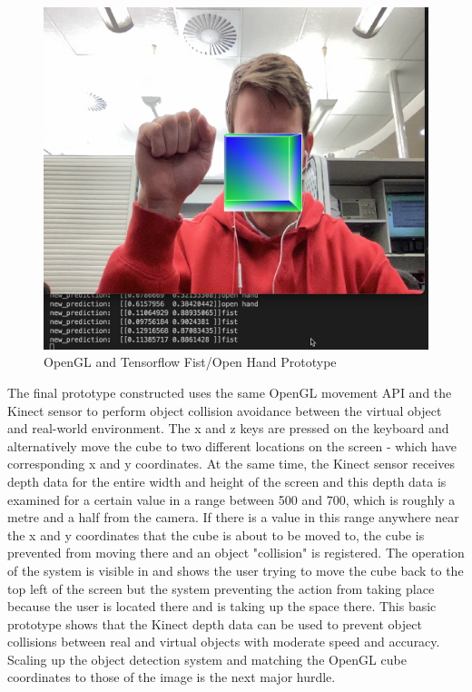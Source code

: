 \begin{figure}[h]
    \centering
    \includegraphics[width=0.6\linewidth]{figures/OpenGL_tensorflow_fist_open_hand.png}
    \caption{OpenGL and Tensorflow Fist/Open Hand Prototype}
    \label{fig:OpenGL_tensorflow_fist_open_hand}
\end{figure}

The final prototype constructed uses the same OpenGL movement API and the Kinect sensor to perform object collision avoidance between the virtual object and real-world environment. The x and z keys are pressed on the keyboard and alternatively move the cube to two different locations on the screen - which have corresponding x and y coordinates. At the same time, the Kinect sensor receives depth data for the entire width and height of the screen and this depth data is examined for a certain value in a range between 500 and 700, which is roughly a metre and a half from the camera. If there is a value in this range anywhere near the x and y coordinates that the cube is about to be moved to, the cube is prevented from moving there and an object "collision" is registered. The operation of the system is visible in  and shows the user trying to move the cube back to the top left of the screen but the system preventing the action from taking place because the user is located there and is taking up the space there. This basic prototype shows that the Kinect depth data can be used to prevent object collisions between real and virtual objects with moderate speed and accuracy. Scaling up the object detection system and matching the OpenGL cube coordinates to those of the image is the next major hurdle.

